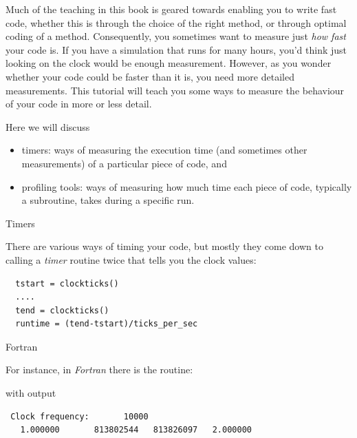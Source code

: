
Much of the teaching in this book is geared towards enabling you to
write fast code, whether this is through the choice of the right
method, or through optimal coding of a method. Consequently, you
sometimes want to measure just \emph{how fast} your code is. If you
have a simulation that runs for many hours, you'd think just looking
on the clock would be enough measurement. However, as you wonder
whether your code could be faster than it is, you need more detailed
measurements. This tutorial will teach you some ways to measure the
behaviour of your code in more or less detail.

Here we will discuss 
\begin{itemize}
\item timers: ways of measuring the execution time (and sometimes
  other measurements) of a particular piece of code, and
\item profiling tools: ways of measuring how much time each piece of
  code, typically a subroutine, takes during a specific run.
\end{itemize}

 {Timers}
\label{sec:perf-timers}

There are various ways of timing your code, but mostly they come down
to calling a \emph{timer} routine twice that tells you the clock values:
\begin{verbatim}
  tstart = clockticks()
  ....
  tend = clockticks()
  runtime = (tend-tstart)/ticks_per_sec
\end{verbatim}

 {Fortran}

For instance, in \emph{Fortran} there is the 
routine:

with output
\begin{verbatim}
 Clock frequency:       10000
   1.000000       813802544   813826097   2.000000  
\end{verbatim}


